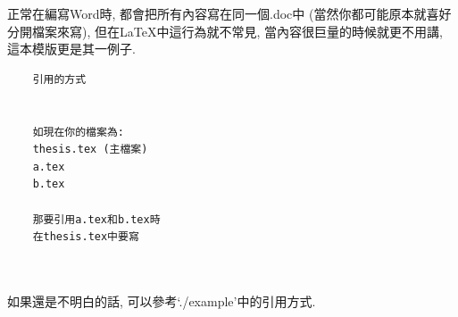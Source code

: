 
正常在編寫Word時, 都會把所有內容寫在同一個.doc中 (當然你都可能原本就喜好分開檔案來寫), 但在LaTeX中這行為就不常見, 當內容很巨量的時候就更不用講, 這本模版更是其一例子.\\

  \begin{DescriptionFrame}
  \begin{verbatim}
    引用的方式
    

    如現在你的檔案為:
    thesis.tex (主檔案)
    a.tex
    b.tex

    那要引用a.tex和b.tex時
    在thesis.tex中要寫
    
    
  \end{verbatim}
  \end{DescriptionFrame}

如果還是不明白的話, 可以參考`./example'中的引用方式.


